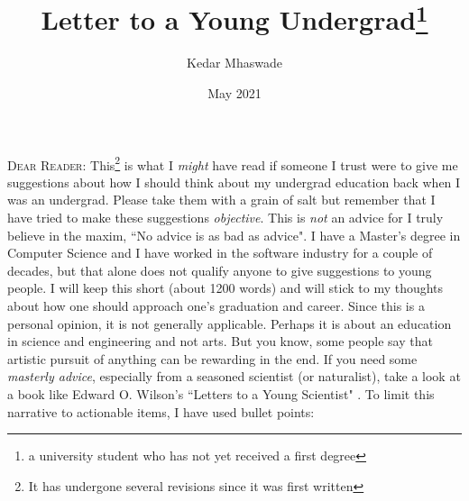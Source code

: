 \documentclass[a6paper]{article}
\begin{document}
\title{Letter to a Young Undergrad\footnote{a university student who has not yet received a first degree}}
\date{May 2021}
\author{Kedar Mhaswade}
\maketitle
\lettrine[lines=3]{D}{ear Reader}: This\footnote{It has undergone several revisions since it was first written} is what I \emph{might} have read if someone I trust were to give me suggestions about how I should think about my undergrad education back when I was an undergrad. Please take them with a grain of salt but remember that I have tried to make these suggestions \emph{objective}. This is \emph{not} an advice for I truly believe in the maxim, ``No advice is as bad as advice". I have a Master's degree in Computer Science and I have worked in the software industry for a couple of decades, but that alone does not qualify anyone to give suggestions to young people. I will keep this short (about 1200 words) and will stick to my thoughts about how one should approach one's graduation and career. Since this is a personal opinion, it is not generally applicable. Perhaps it is about an education in science and engineering and not arts. But you know, some people say that artistic pursuit of anything can be rewarding in the end. If you need some \emph{masterly advice}, especially from a seasoned scientist (or naturalist), take a look at a book like Edward O. Wilson's ``Letters to a Young Scientist" \cite{letters}. To limit this narrative to actionable items, I have used bullet points:
\end{document}
